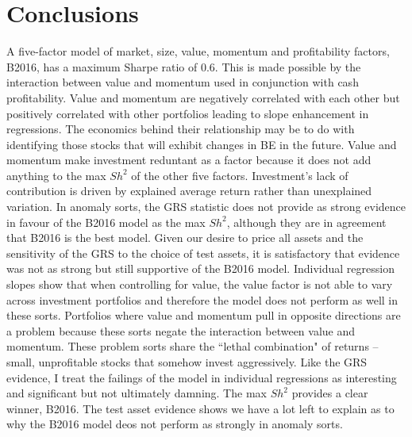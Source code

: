 
\section{Conclusions}

A five-factor model of market, size, value, momentum and profitability factors, B2016, has
a maximum Sharpe ratio of 0.6. This is made possible by the interaction between value and
momentum used in conjunction with cash profitability. Value and momentum are negatively
correlated with each other but positively correlated with other portfolios leading to
slope enhancement in regressions. The economics behind their relationship may be to do
with identifying those stocks that will exhibit changes in BE in the future. Value and
momentum make investment reduntant as a factor because it does not add anything to the max
$Sh^2$ of the other five factors. Investment's lack of contribution is driven by explained
average return rather than unexplained variation. In anomaly sorts, the GRS statistic does
not provide as strong evidence in favour of the B2016 model as the max $Sh^2$, although
they are in agreement that B2016 is the best model. Given our desire to price all assets
and the sensitivity of the GRS to the choice of test assets, it is satisfactory that
evidence was not as strong but still supportive of the B2016 model. Individual regression
slopes show that when controlling for value, the value factor is not able to vary across
investment portfolios and therefore the model does not perform as well in these sorts.
Portfolios where value and momentum pull in opposite directions are a problem because
these sorts negate the interaction between value and momentum. These problem sorts share
the ``lethal combination" of returns -- small, unprofitable stocks that somehow invest
aggressively. Like the GRS evidence, I treat the failings of the model in individual
regressions as interesting and significant but not ultimately damning. The max $Sh^2$
provides a clear winner, B2016. The test asset evidence shows we have a lot left to
explain as to why the B2016 model deos not perform as strongly in anomaly sorts.
